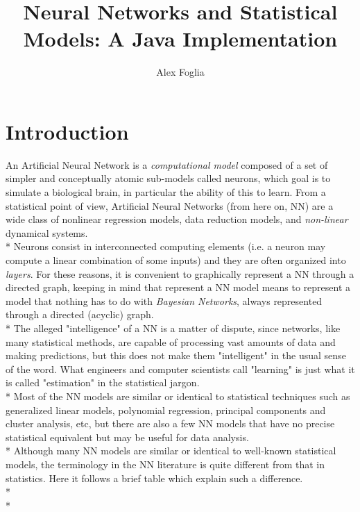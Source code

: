 \documentclass[10pt,a4paper]{article}
\author{Alex Foglia}
\title{Neural Networks and Statistical Models: A Java Implementation}
\begin{document}
	\maketitle
	\tableofcontents
	\newpage
	\section{Introduction}
	An Artificial Neural Network is a \emph{computational model} composed of a set of simpler and conceptually atomic sub-models called neurons, which goal is to simulate a biological brain, in particular the ability of this to learn. From a statistical point of view, Artificial Neural Networks (from here on, NN) are a wide class of nonlinear regression models, data reduction models, and \emph{non-linear} dynamical systems.\\*
	Neurons consist in interconnected computing elements (i.e. a neuron may compute a linear combination of some inputs) and they are often organized into \emph{layers}. For these reasons, it is convenient to graphically represent a NN through a directed graph, keeping in mind that represent a NN model means to represent a model that nothing has to do with \emph{Bayesian Networks}, always represented through a directed (acyclic) graph.\\*
	The alleged "intelligence" of a NN is a matter of dispute, since networks, like many statistical methods, are capable of processing vast amounts of data and making predictions, but this does not make them "intelligent" in the usual sense of the word. What engineers and computer scientists call "learning" is just what it is called "estimation" in the statistical jargon.\\*
	Most of the NN models are similar or identical to statistical techniques such as generalized linear models, polynomial regression, principal components and cluster analysis, etc, but there are also a few NN models that have no precise statistical equivalent but may be useful for data analysis.\\*
	Although many NN models are similar or identical to well-known statistical models, the terminology in the NN literature is quite different from that in statistics. Here it follows a brief table which explain such a difference.
	\\*
	\\*
\end{document}
